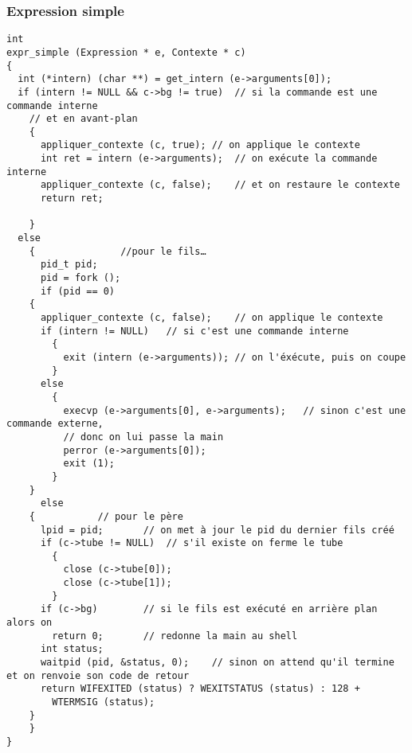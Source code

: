 \documentclass[12pt]{article}
\begin{document}
\subsubsection{Expression simple}
\label{expr_simple}
\begin{verbatim}
int
expr_simple (Expression * e, Contexte * c)
{
  int (*intern) (char **) = get_intern (e->arguments[0]);
  if (intern != NULL && c->bg != true)	// si la commande est une commande interne
    // et en avant-plan
    {
      appliquer_contexte (c, true);	// on applique le contexte
      int ret = intern (e->arguments);	// on exécute la commande interne
      appliquer_contexte (c, false);	// et on restaure le contexte
      return ret;

    }
  else
    {				//pour le fils…
      pid_t pid;
      pid = fork ();
      if (pid == 0)
	{
	  appliquer_contexte (c, false);	// on applique le contexte
	  if (intern != NULL)	// si c'est une commande interne
	    {
	      exit (intern (e->arguments));	// on l'éxécute, puis on coupe
	    }
	  else
	    {
	      execvp (e->arguments[0], e->arguments);	// sinon c'est une commande externe,
	      // donc on lui passe la main
	      perror (e->arguments[0]);
	      exit (1);
	    }
	}
      else
	{			// pour le père
	  lpid = pid;		// on met à jour le pid du dernier fils créé
	  if (c->tube != NULL)	// s'il existe on ferme le tube
	    {
	      close (c->tube[0]);
	      close (c->tube[1]);
	    }
	  if (c->bg)		// si le fils est exécuté en arrière plan alors on
	    return 0;		// redonne la main au shell
	  int status;
	  waitpid (pid, &status, 0);	// sinon on attend qu'il termine et on renvoie son code de retour
	  return WIFEXITED (status) ? WEXITSTATUS (status) : 128 +
	    WTERMSIG (status);
	}
    }
}
 
\end{verbatim}
\end{document}
